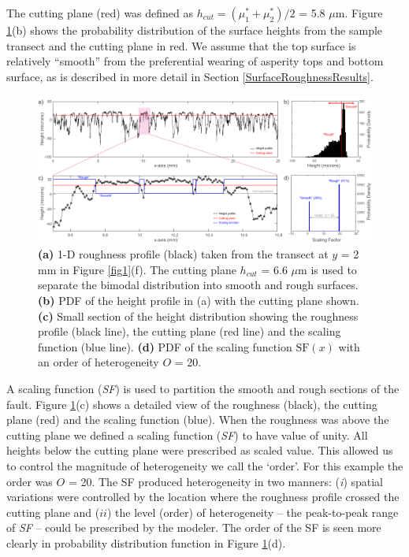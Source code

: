 \documentclass[final,3p, 11pt,authoryear]{elsarticle}
\begin{document}
The cutting plane (red) was defined as $h_{cut} = \left(\mu^{*}_{1}+\mu^{*}_{2} \right)/2$ = 5.8 $\mu$m.  Figure \ref{fig3}(b) shows the probability distribution of the surface heights from the sample transect and the cutting plane in red. We assume that the top surface is relatively ``smooth'' from the preferential wearing of asperity tops and bottom surface, as is described in more detail in Section \ref{SurfaceRoughnessResults}.

\begin{figure}[ht]
	\centering
	\includegraphics{FIG3.pdf} 
	\caption{ \textbf{(a)} 1-D roughness profile (black) taken from the transect at $y$ = 2 mm in Figure \ref{fig1}(f).  The cutting plane $h_{cut}$ = 6.6 $\mu$m is used to separate the bimodal distribution into smooth and rough surfaces. \textbf{(b)} PDF of the height profile in (a) with the cutting plane shown. \textbf{(c)} Small section of the height distribution showing the roughness profile (black line), the cutting plane (red line) and the scaling function (blue line). \textbf{(d)} PDF of the scaling function $\mathrm{SF}(x)$ with an order of heterogeneity $O$ = 20.}
	\label{fig3}
\end{figure}

A scaling function (\textit{SF}) is used to partition the smooth and rough sections of the fault. Figure \ref{fig3}(c) shows a detailed view of the roughness (black), the cutting plane (red) and the scaling function (blue). When the roughness was above the cutting plane we defined a scaling function (\textit{SF}) to have value of unity. All heights below the cutting plane were prescribed as scaled value. This allowed us to control the magnitude of heterogeneity we call the `order'. For this example the order was $O$ = 20. The SF produced heterogeneity in two manners: (\textit{i}) spatial variations were controlled by the location where the roughness profile crossed the cutting plane and ($ii$) the level (order) of heterogeneity -- the peak-to-peak range of \textit{SF} -- could be prescribed by the modeler. The order of the SF is seen more clearly in probability distribution function in Figure \ref{fig3}(d).
\end{document}

